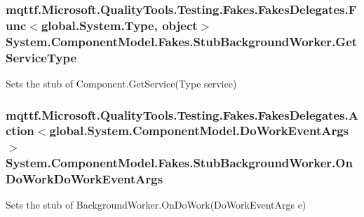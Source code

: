 \hypertarget{class_system_1_1_component_model_1_1_fakes_1_1_stub_background_worker_a03300c01652e26154c96c52b348b91dd}{
\subsubsection[{Get\-Service\-Type}]{\setlength{\rightskip}{0pt plus 5cm}mqttf.\-Microsoft.\-Quality\-Tools.\-Testing.\-Fakes.\-Fakes\-Delegates.\-Func$<$global.\-System.\-Type, object$>$ System.\-Component\-Model.\-Fakes.\-Stub\-Background\-Worker.\-Get\-Service\-Type}}\label{class_system_1_1_component_model_1_1_fakes_1_1_stub_background_worker_a03300c01652e26154c96c52b348b91dd}


Sets the stub of Component.\-Get\-Service(\-Type service)

\hypertarget{class_system_1_1_component_model_1_1_fakes_1_1_stub_background_worker_a3a49242350f4567e881daced877bb6cd}{
\subsubsection[{On\-Do\-Work\-Do\-Work\-Event\-Args}]{\setlength{\rightskip}{0pt plus 5cm}mqttf.\-Microsoft.\-Quality\-Tools.\-Testing.\-Fakes.\-Fakes\-Delegates.\-Action$<$global.\-System.\-Component\-Model.\-Do\-Work\-Event\-Args$>$ System.\-Component\-Model.\-Fakes.\-Stub\-Background\-Worker.\-On\-Do\-Work\-Do\-Work\-Event\-Args}}\label{class_system_1_1_component_model_1_1_fakes_1_1_stub_background_worker_a3a49242350f4567e881daced877bb6cd}


Sets the stub of Background\-Worker.\-On\-Do\-Work(\-Do\-Work\-Event\-Args e)

